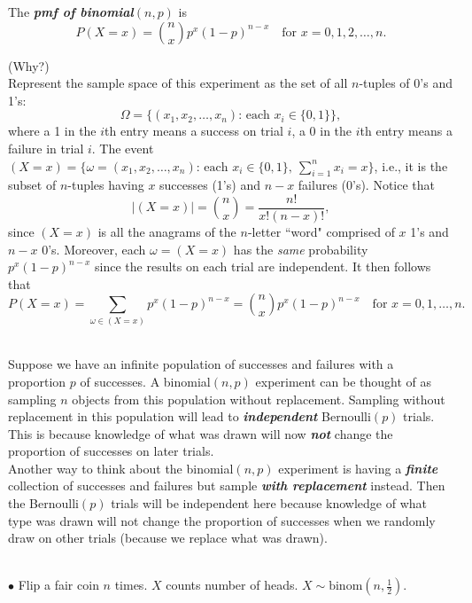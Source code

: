 \documentclass[12pt]{article}
\begin{document}
\noindent The {\bf\em pmf of binomial$(n,p)$} is
$$P(X=x) = {n\choose x}p^x(1-p)^{n-x}\quad\mbox{for }x=0,1,2,\dots,n.$$

\noindent (Why?)\\

\noindent Represent the sample space of this experiment as the set of all $n$-tuples of 0's and 1's:
$$\Omega = \big\{(x_1,x_2,\dots,x_n):\,\mbox{each }x_i\in\{0,1\}\big\},$$
where a 1 in the $i$th entry means a success on trial $i$, a 0 in the $i$th entry means a failure in trial $i$.
The event $(X=x) = \big\{\omega=(x_1,x_2,\dots,x_n):\,\mbox{each }x_i\in\{0,1\},\ \sum_{i=1}^nx_i=x\big\}$,
i.e., it is the subset of $n$-tuples having $x$ successes (1's) and $n-x$ failures (0's). Notice that
$$|(X=x)| = {n\choose x} = \frac {n!}{x!(n-x)!},$$
since $(X=x)$ is all the anagrams of the $n$-letter ``word" comprised of $x$ 1's and $n-x$ 0's. Moreover,
each $\omega=(X=x)$ has the {\em same} probability $p^x(1-p)^{n-x}$ since the results on each trial are independent. It then follows that
$$P(X=x) = \sum_{\omega\in(X=x)}p^x(1-p)^{n-x} = {n\choose x}p^x(1-p)^{n-x}\quad\mbox{for }x=0,1,\dots,n.$$

\bigskip

\label{binomial=largeNhypergeometric}\\
Suppose we have an infinite population of successes and failures with a proportion $p$ of successes.
A binomial$(n,p)$ experiment can be thought of as sampling $n$ objects from this population without replacement.  Sampling without replacement in this population will lead to {\bf\em independent} Bernoulli$(p)$ trials. This is because knowledge of what was drawn will now {\bf\em not} change the proportion of successes on later trials.\\

\noindent Another way to think about the binomial$(n,p)$ experiment is having a {\bf\em finite} collection of successes and failures but sample {\bf\em with replacement} instead.  Then the Bernoulli$(p)$
trials will be independent here because knowledge of what type was drawn will not change the proportion of successes when we randomly draw on other trials (because we replace what was drawn).\\


\newpage


\\

\noindent $\bullet$ Flip a fair coin $n$ times. $X$ counts number of heads.
$X\sim \mbox{binom}(n,\frac 12)$.
\end{document}
